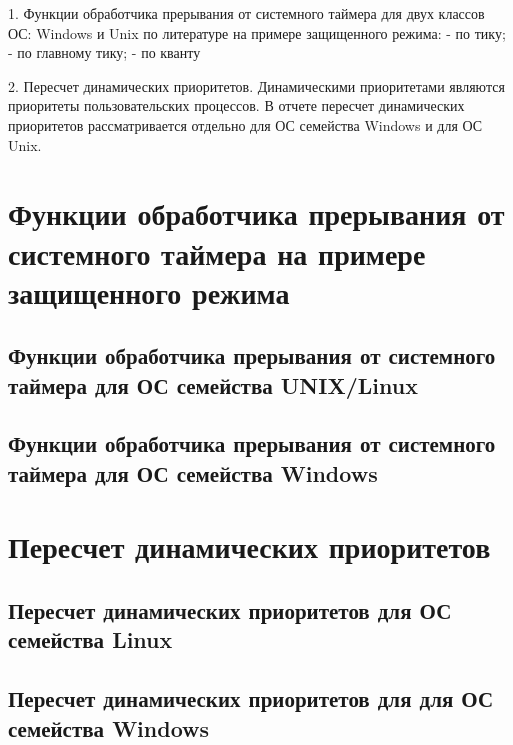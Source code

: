 
    1. Функции обработчика прерывания от системного таймера для двух классов ОС: Windows и Unix по литературе на примере защищенного режима:
- по тику;
- по главному тику;
- по кванту
        
    2. Пересчет динамических приоритетов. Динамическими приоритетами являются приоритеты пользовательских процессов. 
В отчете пересчет динамических приоритетов рассматривается отдельно для ОС семейства Windows и для ОС Unix.

\chapter{Функции обработчика прерывания от системного таймера на примере защищенного режима}

\section{Функции обработчика прерывания от системного таймера для ОС семейства UNIX/Linux}

\section{Функции обработчика прерывания от системного таймера для ОС семейства Windows}

\chapter{Пересчет динамических приоритетов}

\section{Пересчет динамических приоритетов для ОС семейства Linux}

\section{Пересчет динамических приоритетов для для ОС семейства Windows}

